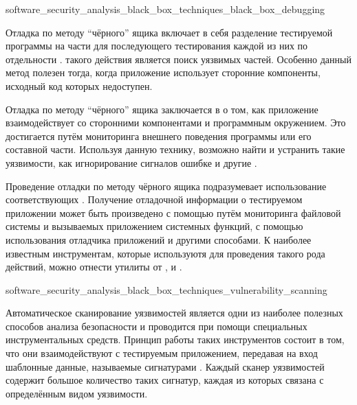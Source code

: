 
	{software_security_analysis_black_box_techniques_black_box_debugging}

%
Отладка по методу ``чёрного'' ящика включает в себя разделение тестируемой программы на части для последующего тестирования каждой из них по отдельности . 
%
 такого действия является поиск уязвимых частей. Особенно данный метод полезен тогда, когда приложение использует сторонние компоненты, исходный код которых недоступен.

%
Отладка по методу ``чёрного'' ящика заключается в  о том, как приложение взаимодействует со сторонними компонентами и программным окружением. 
%
Это достигается путём мониторинга внешнего поведения программы или его составной части. 
%
Используя данную технику, возможно найти и устранить такие уязвимости, как игнорирование сигналов ошибке и другие .

%
Проведение отладки по методу чёрного ящика подразумевает использование соответствующих . 
%
Получение отладочной информации о тестируемом приложении может быть произведено с помощью путём мониторинга файловой системы и вызываемых приложением системных функций, с помощью использования отладчика приложений и другими способами. 
%
К наиболее известным инструментам, которые используютя для проведения такого рода действий, можно отнести утилиты от  ,   и  .


	{software_security_analysis_black_box_techniques_vulnerability_scanning}

%
Автоматическое сканирование уязвимостей является одни из наиболее полезных способов анализа безопасности  и проводится при помощи специальных инструментальных средств. 
%
Принцип работы таких инструментов состоит в том, что они взаимодействуют с тестируемым приложением, передавая на вход шаблонные данные, называемые сигнатурами . 
%
Каждый сканер уязвимостей содержит большое количество таких сигнатур, каждая из которых связана с определённым видом уязвимости.

